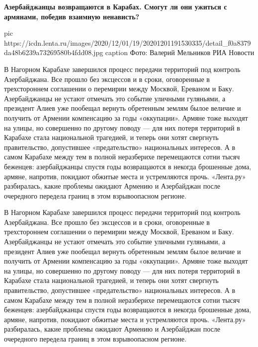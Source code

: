  
 
 
 
 

\begin{leftbar}
	\bfseries
Азербайджанцы возвращаются в Карабах. Смогут ли они ужиться с армянами, победив
взаимную ненависть?
\end{leftbar}

\ifcmt
pic https://icdn.lenta.ru/images/2020/12/01/19/20201201191530335/detail_f0a8379da48b6239a73269580b4fdd08.jpg
caption Фото: Валерий Мельников РИА Новости
\fi

В Нагорном Карабахе завершился процесс передачи территорий под контроль
Азербайджана. Все прошло без эксцессов и в сроки, оговоренные в трехстороннем
соглашении о перемирии между Москвой, Ереваном и Баку. Азербайджанцы не устают
отмечать это событие уличными гуляньями, а президент Алиев уже пообещал вернуть
обретенным землям былое величие и получить от Армении компенсацию за годы
«оккупации». Армяне тоже выходят на улицы, но совершенно по другому поводу —
для них потеря территорий в Карабахе стала национальной трагедией, и теперь они
хотят свергнуть правительство, допустившее «предательство» национальных
интересов. А в самом Карабахе между тем в полной неразберихе перемещаются сотни
тысяч беженцев: азербайджанцы спустя годы возвращаются в некогда брошенные
дома, армяне, напротив, покидают обжитые места и устремляются прочь. «Лента.ру»
разбиралась, какие проблемы ожидают Армению и Азербайджан после очередного
передела границ в этом взрывоопасном регионе.

В Нагорном Карабахе завершился процесс передачи территорий под контроль
Азербайджана. Все прошло без эксцессов и в сроки, оговоренные в трехстороннем
соглашении о перемирии между Москвой, Ереваном и Баку. Азербайджанцы не устают
отмечать это событие уличными гуляньями, а президент Алиев уже пообещал вернуть
обретенным землям былое величие и получить от Армении компенсацию за годы
«оккупации». Армяне тоже выходят на улицы, но совершенно по другому поводу —
для них потеря территорий в Карабахе стала национальной трагедией, и теперь они
хотят свергнуть правительство, допустившее «предательство» национальных
интересов. А в самом Карабахе между тем в полной неразберихе перемещаются сотни
тысяч беженцев: азербайджанцы спустя годы возвращаются в некогда брошенные
дома, армяне, напротив, покидают обжитые места и устремляются прочь. «Лента.ру»
разбиралась, какие проблемы ожидают Армению и Азербайджан после очередного
передела границ в этом взрывоопасном регионе.

